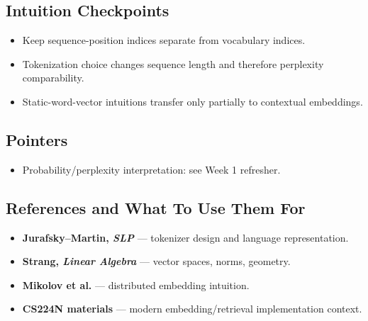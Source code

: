 \subsection*{Intuition Checkpoints}
\begin{itemize}[leftmargin=1.5em]
  \item Keep sequence-position indices separate from vocabulary indices.
  \item Tokenization choice changes sequence length and therefore perplexity comparability.
  \item Static-word-vector intuitions transfer only partially to contextual embeddings.
\end{itemize}

\subsection*{Pointers}
\begin{itemize}[leftmargin=1.5em]
  \item Probability/perplexity interpretation: see Week 1 refresher.
\end{itemize}

\subsection*{References and What To Use Them For}
\begin{itemize}[leftmargin=1.5em]
  \item \textbf{Jurafsky--Martin, \emph{SLP}} --- tokenizer design and language representation.
  \item \textbf{Strang, \emph{Linear Algebra}} --- vector spaces, norms, geometry.
  \item \textbf{Mikolov et al.} --- distributed embedding intuition.
  \item \textbf{CS224N materials} --- modern embedding/retrieval implementation context.
\end{itemize}
